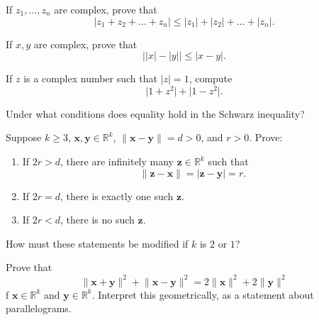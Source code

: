 \documentclass[12 pt, letterpaper]{hmcpset}
\begin{document}
\pagebreak

\begin{problem}[12.]
	If $z_{1}, \dots, z_{n}$ are complex, prove that
	\[
		\lvert z_{1} + z_{2} + \dots + z_{n} \rvert \le \lvert z_{1} \rvert + \lvert z_{2} \rvert + \dots + \lvert z_{n} \rvert.
	\]
\end{problem}

\pagebreak

\begin{problem}[13.]
	If $x, y$ are complex, prove that
	\[
		\lvert \lvert x \rvert - \lvert y \rvert \rvert \le \lvert x - y \rvert.
	\]
\end{problem}

\pagebreak

\begin{problem}[14.]
	If $z$ is a complex number such that $\lvert z  \rvert = 1$, compute
	\[
		\lvert 1 + z^{2} \rvert + \lvert 1 - z^{2} \rvert.
	\]
\end{problem}

\pagebreak

\begin{problem}[15.]
	Under what conditions does equality hold in the Schwarz inequality?
\end{problem}

\pagebreak

\begin{problem}[16.]
	Suppose $k \ge 3$, $\mathbf{x}, \mathbf{y} \in \mathbb{R}^{k}$, $\lVert \mathbf{x} - \mathbf{y} \rVert = d > 0$, and $r > 0$. Prove:
	\begin{enumerate}
		\item If $2r > d$, there are infinitely many $\mathbf{z} \in \mathbb{R}^{k}$ such that 
			\[
				\lVert \mathbf{z} - \mathbf{x} \rVert = \lvert \mathbf{z} - \mathbf{y} \rvert = r.
			\]
		\item If $2r = d$, there is exactly one such $\mathbf{z}$.
		\item If $2r < d$, there is no such $\mathbf{z}$.
	\end{enumerate}
	How must these statements be modified if $k$ is $2$ or $1$?
\end{problem}

\pagebreak

\begin{problem}[17.]
	Prove that
	\[
		\lVert \mathbf{x} + \mathbf{y} \rVert^{2} + \lVert \mathbf{x} - \mathbf{y} \rVert^{2} = 2 \lVert \mathbf{x} \rVert^{2} + 2 \lVert \mathbf{y} \rVert^{2}
	\]
	f $\mathbf{x} \in \mathbb{R}^{k}$ and $\mathbf{y} \in \mathbb{R}^{k}$. Interpret this geometrically, as a statement about parallelograms.
\end{problem}
\end{document}
